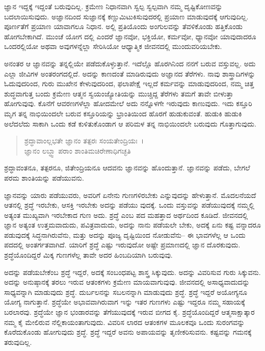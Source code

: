 ಜ್ಞಾನ ಇದ್ದಕ್ಕೆ ಇದ್ದಂತೆ ಬರುವುದಿಲ್ಲ. ಕ್ರಮೇಣ ನಿಧಾನವಾಗಿ ಸ್ವಲ್ಪ ಸ್ವಲ್ಪವಾಗಿ ನಮ್ಮ ದೃಷ್ಟಿಕೋಣವನ್ನು ಬದಲಾಯಿಸುವುದು. ಅಜ್ಞಾನದಿಂದ ಸುಜ್ಞಾನಕ್ಕೆ ಕಣ್ಣುಮಿಟುಕಿಸುವುದರಲ್ಲಿ ಪ್ರಯಾಣ ಮಾಡುವುದಕ್ಕೆ ಆಗುವುದಿಲ್ಲ. ಪೂರ್ಣತೆಗೆ ಪ್ರಯಾಣ ಯಾವಾಗಲೂ ನಿಧಾನ. ಅಲ್ಲಿ ಪ್ರತಿಯೊಂದು ಅಂಗುಲವನ್ನು ತೆವಳಿಕೊಂಡು ಹತ್ತಿಕೊಂಡು ಹೋಗಬೇಕಾಗಿದೆ. ಮುಂಚೆ ಯೋಗ ದಲ್ಲಿ ಎಂದರೆ ಜ್ಞಾನವೋ, ಭಕ್ತಿಯೋ, ಕರ್ಮವೋ, ಧ್ಯಾನವೋ ಯಾವುದಾದರೂ ಒಂದರಲ್ಲಿಯೋ ಅಥವಾ ಅವುಗಳನ್ನೆಲ್ಲಾ ಸೇರಿಸಿಯೋ ಆಧ್ಯಾತ್ಮಿಕ ಜೀವನದಲ್ಲಿ ಮುಂದುವರಿಯಬೇಕು.

ಅನಂತರ ಆ ಜ್ಞಾನವನ್ನು ತನ್ನಲ್ಲಿಯೇ ಪಡೆದುಕೊಳ್ಳುತ್ತಾನೆ. ಇದೆಲ್ಲೊ ಹೊರಗಿನಿಂದ ನನಗೆ ಬರುವ ವಸ್ತುವಲ್ಲ. ಅದು ಎಲ್ಲಾ ಜೀವಿಗಳ ಅಂತರಂಗದಲ್ಲಿದೆ. ಅದನ್ನು ಕಾಣದಂತೆ ಮಾಡಿರುವುದು ಅಜ್ಞಾನದ ತೆರೆಗಳು. ನಾವು ಶಾಸ್ತ್ರಾದಿಗಳನ್ನು ಓದುವುದರಿಂದ, ಗುರು ಮುಖೇನ ಕೇಳುವುದರಿಂದ, ಫಲಾಪೇಕ್ಷೆ ಇಲ್ಲದೆ ಕರ್ಮವನ್ನು ಮಾಡುವುದರಿಂದ, ನಮ್ಮ ಚಿತ್ತ ಶುದ್ಧವಾಗುತ್ತ ಬಂದು ಕ್ರಮೇಣ ಆತ್ಮನ ಸ್ವಯಂಜ್ಯೋತಿಯನ್ನು ಮುಚ್ಚಿದ್ದ ತೆರೆಗಳು ತಮಗೆ ತಾವೇ ಬೀಳುತ್ತಾ ಹೋಗುವುವು. ಕೊನೆಗೆ ಆವರಣಗಳೆಲ್ಲಾ ಹೋದಮೇಲೆ ಅದು ನನ್ನೊಳಗೇ ಇರುವುದು ಕಾಣುವುದು. ಇದು ಕಸ್ತೂರಿ ಮೃಗ ತನ್ನ ನಾಭಿಯಿಂದಲೇ ಬರುವ ಕಸ್ತೂರಿಯನ್ನು ಭ್ರಾಂತಿಯಿಂದ ಹೊರಗೆ ಹುಡುಕುವಂತೆ. ಹುಡುಕಿ ಹುಡುಕಿ ಅಲೆದಲೆದು ಸಾಕಾಗಿ ಒಂದು ಕಡೆ ಕುಳಿತುಕೊಂಡಾಗ ಆ ಪರಿಮಳ ತನ್ನ ನಾಭಿಯಿಂದಲೇ ಬರುವುದು ಗೊತ್ತಾಗುವುದು.

\begin{verse}
ಶ್ರದ್ಧಾವಾಂಲ್ಲಭತೇ ಜ್ಞಾನಂ ತತ್ಪರಃ ಸಂಯತೇಂದ್ರಿಯಃ~।\\ಜ್ಞಾನಂ ಲಬ್ಧ್ವಾ ಪರಾಂ ಶಾಂತಿಮಚಿರೇಣಾಧಿಗಚ್ಛತಿ 
\end{verse}

{\small ಶ್ರದ್ಧಾವಂತನೂ, ತತ್ಪರನೂ, ಜಿತೇಂದ್ರಿಯನೂ ಆದವನು ಜ್ಞಾನವನ್ನು ಹೊಂದುತ್ತಾನೆ. ಜ್ಞಾನವನ್ನು ಪಡೆದು, ಬೇಗಲೆ ಪರಮ ಶಾಂತಿಯನ್ನು ಪಡೆಯುವನು.}

ಜ್ಞಾನವನ್ನು ಯಾರು ಪಡೆಯುವರು, ಅವರಿಗೆ ಏನೇನು ಗುಣಗಳಿರಬೇಕು ಎನ್ನುವುದನ್ನು ಹೇಳುತ್ತಾನೆ. ಮೊದಲನೆಯದೆ ಆತನಲ್ಲಿ ಶ್ರದ್ಧೆ ಇರಬೇಕು, ಆಸಕ್ತಿ ಇರಬೇಕು ಅದನ್ನು ಪಡೆಯು ವುದಕ್ಕೆ. ಒಂದು ವಸ್ತುವನ್ನು ಪಡೆಯುವುದಕ್ಕೆ ನಮ್ಮಲ್ಲಿ ಅತ್ಯಂತ ಮುಖ್ಯವಾಗಿ ಇರಬೇಕಾದ ಗುಣ ಅದು. ಶ್ರದ್ಧೆ ಎಂಬ ಪದ ಮಹತ್ತಾದ ಅರ್ಥದಿಂದ ಕೂಡಿದೆ. ಜೀವನದಲ್ಲಿ ಜ್ಞಾನ ಅತ್ಯಂತ ಉತ್ತಮವಾದುದು, ಪವಿತ್ರವಾದುದು, ಅದನ್ನು ನಾನು ಪಡೆಯಲೇ ಬೇಕು, ಅದಕ್ಕೆ ಏನು ಕಷ್ಟ ವನ್ನಾದರೂ ಪಡುವುದಕ್ಕೆ ಸಿದ್ಧನಾಗಿರುವೆನು, ಮತ್ತು ಅದನ್ನು ಪೂಜ್ಯ ದೃಷ್ಟಿಯಿಂದ ನೋಡುವೆನು– ಈ ಭಾವಗಳೆಲ್ಲ ಆ ಒಂದು ಪದದಲ್ಲಿ ಅಂತರ್ಗತವಾಗಿದೆ. ಯಾರಿಗೆ ಶ್ರದ್ಧೆ ಎಷ್ಟು ಇರುವುದೋ ಅಷ್ಟೇ ಪ್ರಮಾಣದಲ್ಲಿ ಜ್ಞಾನ ದೊರಕುವುದು. ಶ್ರದ್ಧೆಯೊಂದಿದ್ದರೆ ಮಿಕ್ಕ ಗುಣಗಳೆಲ್ಲ ತಾವೇ ಅದರ ಹಿಂಬದಿಯಾಗಿ ಬರುವುವು.

ಅದನ್ನು ಪಡೆಯಬೇಕೆಂಬ ಶ್ರದ್ಧೆ ಇದ್ದರೆ, ಅದಕ್ಕೆ ಸಂಬಂಧಪಟ್ಟ ಶಾಸ್ತ್ರ ಸಿಕ್ಕುವುದು. ಅದನ್ನು ವಿವರಿಸುವ ಗುರು ಸಿಕ್ಕುವನು. ಅದನ್ನು ಅನುಷ್ಠಾನಕ್ಕೆ ತರಲು ಇರುವ ಆತಂಕಗಳು ಕ್ರಮೇಣ ಮಾಯವಾಗುವುವು. ಜೀವನದಲ್ಲಿ ಅಸಾಧ್ಯವಾದುದನ್ನು ಸಾಧ್ಯವನ್ನಾಗಿ ಮಾಡುವುದು ಶ್ರದ್ಧೆ. ದುರ್ಬಲನನ್ನು ಸಬಲನನ್ನಾಗಿ ಮಾಡುವುದು ಶ್ರದ್ಧೆ. ಶ್ರದ್ಧೆ ಇದ್ದರೆ ಅಯೋಗ್ಯನೂ ಯೋಗ್ಯ ನಾಗುತ್ತಾನೆ. ಶ್ರದ್ಧೆಯೇ ಅಭಾವವಾಗಿರುವಾಗ ಇನ್ನು ಇತರ ಗುಣಗಳು ಎಷ್ಟು ಇದ್ದರೂ ನಮ್ಮ ಸಹಾಯಕ್ಕೆ ಬರಲಾರವು. ಶ್ರದ್ಧೆಯೇ ಜ್ಞಾನ ಭಂಡಾರವನ್ನು ತೆಗೆಯುವುದಕ್ಕೆ ಇರುವ ಬೀಗದ ಕೈ. ಶ್ರದ್ಧೆಯೊಂದಿದ್ದರೆ ಆತ್ಮಸಾಕ್ಷಾತ್ಕಾರ ನಮ್ಮ ಕೈ ಮೇಲಿರುವ ನೆಲ್ಲಿಕಾಯಂತಾಗುವುದು. ವಿವರಿಸ ಲಾರದ ಆತಂಕಗಳ ಮೂಲಕವೂ ಒಂದು ಸುರಂಗವನ್ನು ಕೊರೆದುಕೊಂಡು ಹೋಗುವುದು ಶ್ರದ್ಧೆ. ಶ್ರದ್ಧೆ ಇದ್ದರೆ ಅವನು ಅಪಾಯವನ್ನು ತೃಣೀಕರಿಸುವನು. ಕಷ್ಟವನ್ನು ಗಮನಕ್ಕೆ ತರುವುದಿಲ್ಲ.

